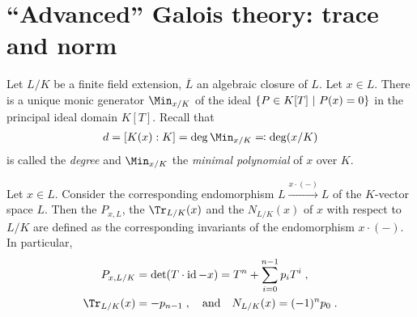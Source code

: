 \documentclass[a4paper,parskip=half,numbers=enddot, DIV=12, headheight=30pt]{scrreprt}
\begin{document}
\section{``Advanced'' Galois theory: trace and norm}
Let $L/K$ be a finite field extension, $\overline{L}$ an algebraic closure of $L$. Let $x\in L$. There is a unique monic generator $\Min_{x/K}$ of the ideal $\left\{P\in K[T]\ \middle|\  P(x) = 0\right\}$ in the principal ideal domain $K[T]$. Recall that 
\begin{align*}
	d=[K(x):K]=\deg\Min_{x/K}\eqqcolon\deg(x/K)
\end{align*}
is called the \emph{degree} and $\Min_{x/K}$ the \emph{minimal polynomial} of $x$ over $K$.
\begin{defi}
	Let $x\in L$. Consider the corresponding endomorphism $L\xrightarrow{x\cdot(-)} L$ of the $K$-vector space $L$. Then the  $P_{x,L}$, the  $\Tr_{L/K}(x)$ and the  $N_{L/K}(x)$ of $x$ with respect to $L/K$ are defined as the corresponding invariants of the endomorphism $x\cdot(-)$. In particular,
	\begin{align*}
		P_{x,L/K} &= \det(T\cdot \id -x) = T^n+\sum_{i=0}^{n-1} p_iT^i\;,\\
		\Tr_{L/K}(x)&=-p_{n-1}\;,\quad\text{and}\quad N_{L/K}(x)=(-1)^{n}p_0\;.
	\end{align*}
\end{defi}
\end{document}
